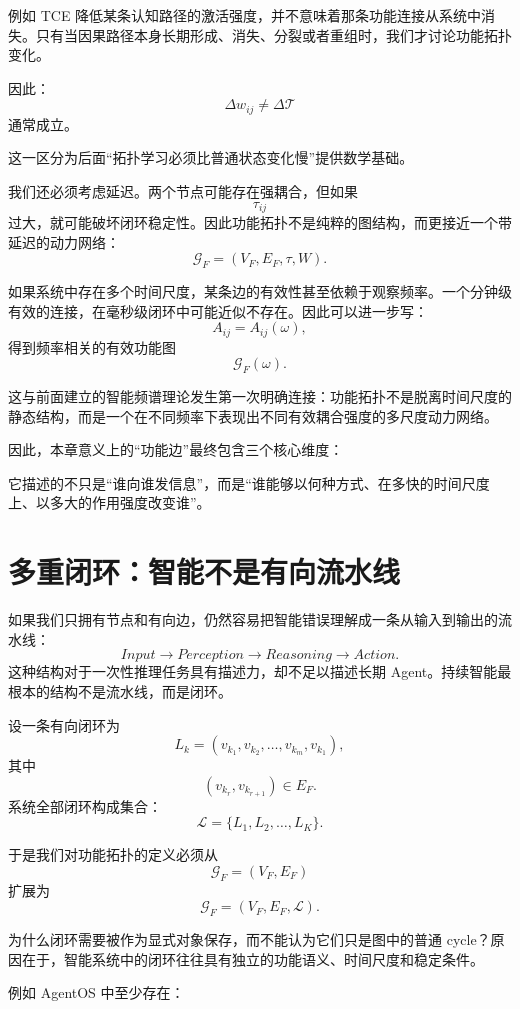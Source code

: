 例如 TCE 降低某条认知路径的激活强度，并不意味着那条功能连接从系统中消失。只有当因果路径本身长期形成、消失、分裂或者重组时，我们才讨论功能拓扑变化。

因此：
\[
\Delta w_{ij}\neq \Delta\mathcal T
\]
通常成立。

这一区分为后面“拓扑学习必须比普通状态变化慢”提供数学基础。

我们还必须考虑延迟。两个节点可能存在强耦合，但如果
\[
\tau_{ij}
\]
过大，就可能破坏闭环稳定性。因此功能拓扑不是纯粹的图结构，而更接近一个带延迟的动力网络：
\[
\mathcal G_F
=
(V_F,E_F,\tau,W).
\]

如果系统中存在多个时间尺度，某条边的有效性甚至依赖于观察频率。一个分钟级有效的连接，在毫秒级闭环中可能近似不存在。因此可以进一步写：
\[
A_{ij}=A_{ij}(\omega),
\]
得到频率相关的有效功能图
\[
\mathcal G_F(\omega).
\]

这与前面建立的智能频谱理论发生第一次明确连接：功能拓扑不是脱离时间尺度的静态结构，而是一个在不同频率下表现出不同有效耦合强度的多尺度动力网络。

因此，本章意义上的“功能边”最终包含三个核心维度：
\begin{statementbox}
\centering
{}
\end{statementbox}
它描述的不只是“谁向谁发信息”，而是“谁能够以何种方式、在多快的时间尺度上、以多大的作用强度改变谁”。


\section{多重闭环：智能不是有向流水线}

如果我们只拥有节点和有向边，仍然容易把智能错误理解成一条从输入到输出的流水线：
\[
Input
\rightarrow
Perception
\rightarrow
Reasoning
\rightarrow
Action.
\]
这种结构对于一次性推理任务具有描述力，却不足以描述长期 Agent。持续智能最根本的结构不是流水线，而是闭环。

设一条有向闭环为
\[
L_k
=
(v_{k_1},v_{k_2},\ldots,v_{k_m},v_{k_1}),
\]
其中
\[
(v_{k_r},v_{k_{r+1}})\in E_F.
\]
系统全部闭环构成集合：
\[
\mathcal L
=
\{L_1,L_2,\ldots,L_K\}.
\]

于是我们对功能拓扑的定义必须从
\[
\mathcal G_F=(V_F,E_F)
\]
扩展为
\[
\boxed{
\mathcal G_F
=
(V_F,E_F,\mathcal L).
}
\]

为什么闭环需要被作为显式对象保存，而不能认为它们只是图中的普通 cycle？原因在于，智能系统中的闭环往往具有独立的功能语义、时间尺度和稳定条件。

例如 AgentOS 中至少存在：

